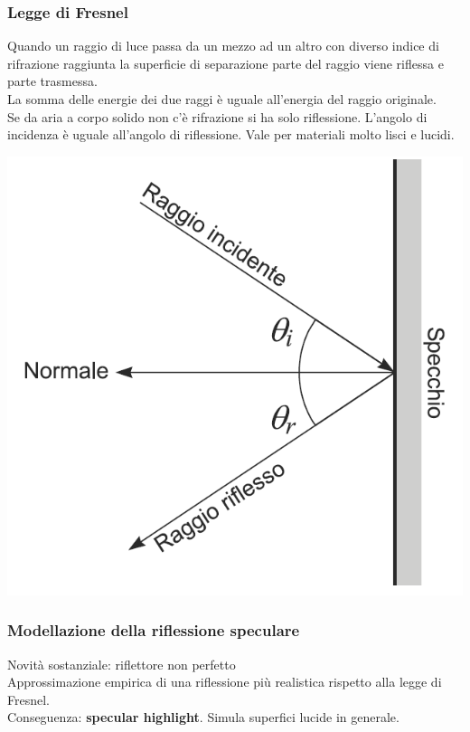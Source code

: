 \documentclass[a4paper, 10pt]{article}
\begin{document}
		\subsubsection{Legge di Fresnel}
			\begin{multicols}{2}
				Quando un raggio di luce passa da un mezzo ad un altro con
				diverso indice di rifrazione raggiunta la superficie di
				separazione parte del raggio viene riflessa e parte trasmessa.\\
				La somma delle energie dei due raggi è uguale all’energia del
				raggio originale.\\
				Se da aria a corpo solido non c’è rifrazione si ha solo
				riflessione. L’angolo di incidenza è uguale all’angolo di
				riflessione. Vale per materiali molto lisci e lucidi.
				
				\columnbreak
				
				\includegraphics[scale=0.25]{fresnel}
			\end{multicols}
			
		\subsubsection{Modellazione della riflessione speculare}
			Novità sostanziale: riflettore non perfetto\\
			Approssimazione empirica di una riflessione più realistica
			rispetto alla legge di Fresnel.\\
			Conseguenza: \textbf{specular highlight}. Simula superfici lucide in
			generale.
			
\end{document}
